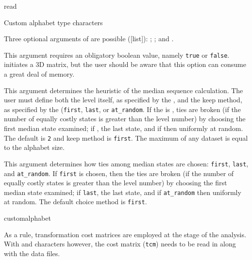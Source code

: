 \begin{command}{read}{}
\begin{arguments}
\begin{argumentgroup}{Custom alphabet type characters}
{Three optional arguments of  are possible ([\poylident list]): 
; ; and . 

\begin{description}

 {\obligatory\poybool}
{This argument requires an obligatory boolean value, namely \texttt{true} or \texttt{false}.
 initiates a 3D matrix, but the user should be aware 
that this option can consume a great deal of memory.}
{}

{This argument determines the heuristic  of the median sequence calculation. 
The user must define both the level itself, as specified by the \poyint, and the keep method, as specified 
by the \poylident (\texttt{first}, \texttt{last}, or \texttt{at\_random}. If the \poylident is , 
ties are broken (if the number of equally costly states is greater than the level number) by choosing the 
first median state examined; if , the last state, and if 
then uniformly at random. The default  is \texttt{2} and keep method is \texttt{first}. 
The maximum  of any dataset is equal to the alphabet size.}
{}

{This argument determines how ties among median states are chosen: \texttt{first}, \texttt{last}, 
and \texttt{at\_random}. If \texttt{first} is chosen, then the ties are broken (if the number of 
equally costly states is greater than the level number) by choosing the first median state examined; 
if \texttt{last}, the last state, and if \texttt{at\_random} then uniformly at random. The default choice method is \texttt{first}.}
{}

\end{description}

}
{customalphabet}

\end{argumentgroup}

\begin{statement}
As a rule, transformation cost matrices are employed at the  stage of the
analysis. With  and  characters however, 
the cost matrix (\texttt{tcm}) needs to be read in along with the data files.
\end{statement}


\end{arguments}
\end{command}
